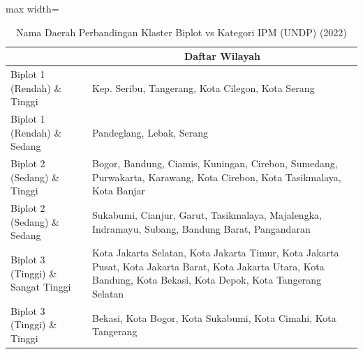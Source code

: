 \begin{table}[H]
\centering
\caption{Nama Daerah Perbandingan Klaster Biplot vs Kategori IPM (UNDP) (2022)} \label{tab:app1crossname2022}
\begin{adjustbox}{max width=\textwidth}
\begin{tabular}{|>{\centering\arraybackslash}p{4cm}|p{10cm}|}
\hline
\multicolumn{1}{|c|}{\textbf{Kategori}} & \multicolumn{1}{c|}{\textbf{Daftar Wilayah}} \\
\hline
Biplot 1 (Rendah) \& Tinggi & Kep. Seribu, Tangerang, Kota Cilegon, Kota Serang \\
\hline
Biplot 1 (Rendah) \& Sedang & Pandeglang, Lebak, Serang \\
\hline
Biplot 2 (Sedang) \& Tinggi & Bogor, Bandung, Ciamis, Kuningan, Cirebon, Sumedang, Purwakarta, Karawang, Kota Cirebon, Kota Tasikmalaya, Kota Banjar \\
\hline
Biplot 2 (Sedang) \& Sedang & Sukabumi, Cianjur, Garut, Tasikmalaya, Majalengka, Indramayu, Subang, Bandung Barat, Pangandaran \\
\hline
Biplot 3 (Tinggi) \& Sangat Tinggi & Kota Jakarta Selatan, Kota Jakarta Timur, Kota Jakarta Pusat, Kota Jakarta Barat, Kota Jakarta Utara, Kota Bandung, Kota Bekasi, Kota Depok, Kota Tangerang Selatan \\
\hline
Biplot 3 (Tinggi) \& Tinggi & Bekasi, Kota Bogor, Kota Sukabumi, Kota Cimahi, Kota Tangerang \\
\hline
\end{tabular}
\end{adjustbox}
\end{table}